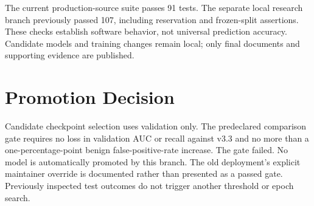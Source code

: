 The current production-source suite passes 91 tests. The separate local research branch previously passed 107, including reservation and frozen-split assertions. These checks establish software behavior, not universal prediction accuracy. Candidate models and training changes remain local; only final documents and supporting evidence are published.

\section{Promotion Decision}
Candidate checkpoint selection uses validation only. The predeclared comparison gate requires no loss in validation AUC or recall against v3.3 and no more than a one-percentage-point benign false-positive-rate increase. The gate failed. No model is automatically promoted by this branch. The old deployment's explicit maintainer override is documented rather than presented as a passed gate. Previously inspected test outcomes do not trigger another threshold or epoch search.